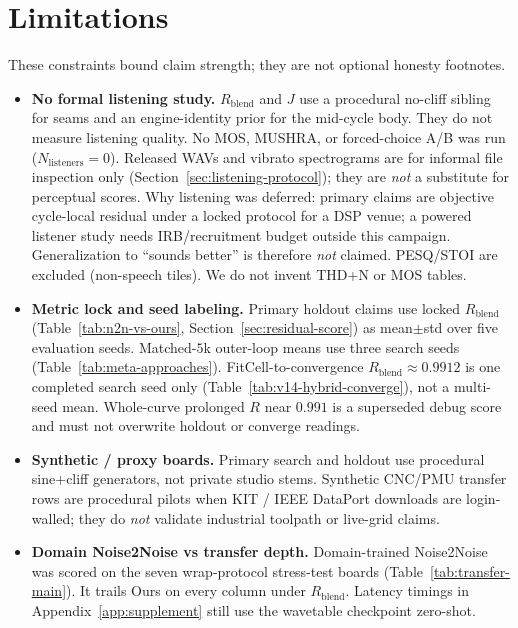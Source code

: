 \section{Limitations}
\label{sec:limitations}

These constraints bound claim strength; they are not optional honesty footnotes.

\begin{itemize}
  \item \textbf{No formal listening study.}
    $R_{\mathrm{blend}}$ and $J$ use a procedural no-cliff sibling for seams and an engine-identity prior for the mid-cycle body.
    They do not measure listening quality.
    No MOS, MUSHRA, or forced-choice A/B was run ($N_{\mathrm{listeners}}{=}0$).
    Released WAVs and vibrato spectrograms are for informal file inspection only
    (Section~\ref{sec:listening-protocol}); they are \emph{not} a substitute for perceptual scores.
    Why listening was deferred: primary claims are objective cycle-local residual under a locked protocol for a DSP venue;
    a powered listener study needs IRB/recruitment budget outside this campaign.
    Generalization to ``sounds better'' is therefore \emph{not} claimed.
    PESQ/STOI are excluded (non-speech tiles). We do not invent THD+N or MOS tables.
  \item \textbf{Metric lock and seed labeling.}
    Primary holdout claims use locked $R_{\mathrm{blend}}$ (Table~\ref{tab:n2n-vs-ours}, Section~\ref{sec:residual-score}) as mean$\pm$std over five evaluation seeds.
    Matched-$5$k outer-loop means use three search seeds (Table~\ref{tab:meta-approaches}).
    FitCell-to-convergence $R_{\mathrm{blend}}{\approx}0.9912$ is one completed search seed only (Table~\ref{tab:v14-hybrid-converge}), not a multi-seed mean.
    Whole-curve prolonged $R$ near $0.991$ is a superseded debug score and must not overwrite holdout or converge readings.
  \item \textbf{Synthetic / proxy boards.}
    Primary search and holdout use procedural sine{+}cliff generators, not private studio stems.
    Synthetic CNC/PMU transfer rows are procedural pilots when KIT / IEEE DataPort downloads are login-walled;
    they do \emph{not} validate industrial toolpath or live-grid claims.
  \item \textbf{Domain Noise2Noise vs transfer depth.}
    Domain-trained Noise2Noise was scored on the seven wrap-protocol stress-test boards
    (Table~\ref{tab:transfer-main}). It trails Ours on every column under $R_{\mathrm{blend}}$.
    Latency timings in Appendix~\ref{app:supplement} still use the wavetable checkpoint zero-shot.

\end{itemize}
